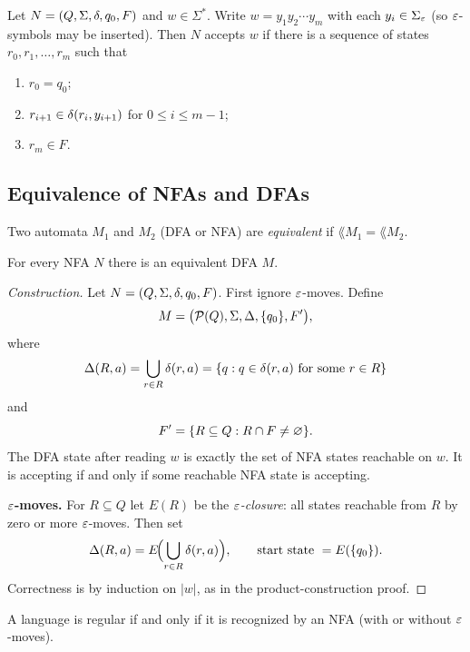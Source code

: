 \begin{definition}
Let $N=(Q,\Sigma,\delta,q_0,F)$ and $w\in\Sigma^*$. Write $w=y_1y_2\cdots y_m$
with each $y_i\in\Sigma_\varepsilon$ (so $\varepsilon$-symbols may be inserted). Then $N$
accepts $w$ if there is a sequence of states $r_0,r_1,\ldots,r_m$ such that
\begin{enumerate}
  \item $r_0=q_0$;
  \item $r_{i+1}\in\delta(r_i,y_{i+1})$ for $0\leq i\leq m-1$;
  \item $r_m\in F$.
\end{enumerate}
\end{definition}

\subsection{Equivalence of NFAs and DFAs}
\begin{definition}
Two automata $M_1$ and $M_2$ (DFA or NFA) are \emph{equivalent} if
$\lang{M_1}=\lang{M_2}$.
\end{definition}

\begin{theorem}
For every NFA $N$ there is an equivalent DFA $M$.
\end{theorem}

\begin{proof}[Construction]
Let $N=(Q,\Sigma,\delta,q_0,F)$. First ignore $\varepsilon$-moves. Define
\[
  M=\bigl(\mathcal{P}(Q),\Sigma,\Delta,\{q_0\},F'\bigr),
\]
where
\[
  \Delta(R,a)=\bigcup_{r\in R}\delta(r,a)
  =\{q:q\in\delta(r,a)\text{ for some }r\in R\}
\]
and
\[
  F'=\{R\subseteq Q:R\cap F\neq\varnothing\}.
\]
The DFA state after reading $w$ is exactly the set of NFA states reachable
on $w$. It is accepting if and only if some reachable NFA state is accepting.

\textbf{$\varepsilon$-moves.} For $R\subseteq Q$ let $E(R)$ be the
\emph{$\varepsilon$-closure}: all states reachable from $R$ by zero or more
$\varepsilon$-moves. Then set
\[
  \Delta(R,a)=E\!\Bigl(\bigcup_{r\in R}\delta(r,a)\Bigr),
  \qquad
  \text{start state }=E(\{q_0\}).
\]
Correctness is by induction on $|w|$, as in the product-construction proof.
\end{proof}

\begin{corollary}
A language is regular if and only if it is recognized by an NFA (with or
without $\varepsilon$-moves).
\end{corollary}

